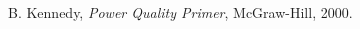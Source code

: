 \begin{thebibliography}{99}

 B. Kennedy, \textit{Power Quality Primer}, McGraw-Hill, 2000.

\end{thebibliography}